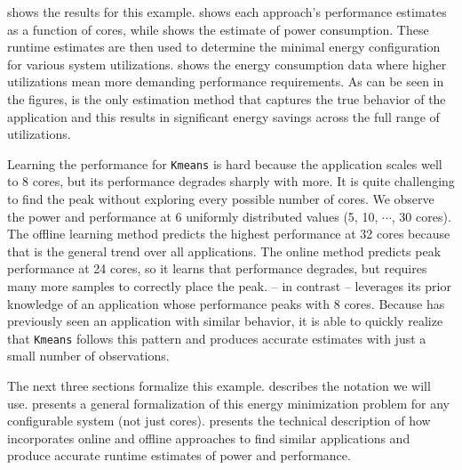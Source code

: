  shows the results for this example.
 shows each approach's performance estimates as
a function of cores, while  shows the estimate
of power consumption.  These runtime estimates are then used to
determine the minimal energy configuration for various system
utilizations.   shows the energy consumption
data where higher utilizations mean more demanding performance
requirements.  As can be seen in the figures, \SYSTEM{} is the only
estimation method that captures the true behavior of the application
and this results in significant energy savings across the full range
of utilizations.

Learning the performance for \texttt{Kmeans} is hard because the
application scales well to 8 cores, but its performance degrades
sharply with more.  It is quite challenging to find the peak without
exploring every possible number of cores. We observe the power and
performance at 6 uniformly distributed values (5, 10, $\cdots$, 30
cores).  The offline learning method predicts the highest performance
at 32 cores because that is the general trend over all applications.
The online method predicts peak performance at 24 cores, so it learns
that performance degrades, but requires many more samples to correctly
place the peak.  \SYSTEM{} -- in contrast -- leverages its prior
knowledge of an application whose performance peaks with 8 cores.
Because \SYSTEM{} has previously seen an application with similar
behavior, it is able to quickly realize that \texttt{Kmeans} follows
this pattern and \SYSTEM{} produces accurate estimates with just a
small number of observations.

The next three sections formalize this example.  
describes the notation we will use. 
presents a general formalization of this energy minimization problem
for any configurable system (not just cores).  
presents the technical description of how \SYSTEM{} incorporates
online and offline approaches to find similar applications and produce
accurate runtime estimates of power and performance.

